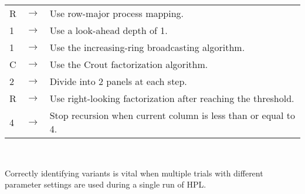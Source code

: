 \documentclass[a4paper, 11pt]{article}
\begin{document}
\begin{tabular}{ l l l }
R & $\rightarrow$ & Use row-major process mapping. \\
1 & $\rightarrow$ & Use a look-ahead depth of 1. \\
1 & $\rightarrow$ & Use the increasing-ring broadcasting algorithm. \\
C & $\rightarrow$ & Use the Crout factorization algorithm. \\
2 & $\rightarrow$ & Divide into 2 panels at each step. \\
R & $\rightarrow$ & Use right-looking factorization after reaching the threshold. \\
4 & $\rightarrow$ & Stop recursion when current column is less than or equal to 4. \\
\end{tabular}

\

Correctly identifying variants is vital when multiple trials with different parameter settings are used during a single run of HPL.




\end{document}
